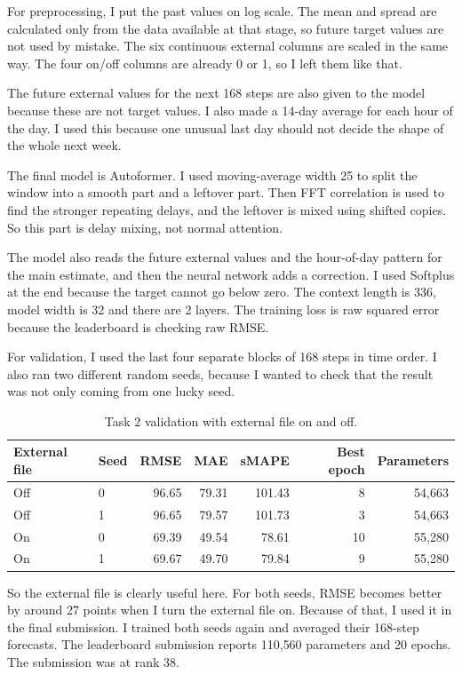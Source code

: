 \documentclass[11pt]{article}
\begin{document}
For preprocessing, I put the past values on log scale. The mean and spread are calculated only from the data available at that stage, so future target values are not used by mistake. The six continuous external columns are scaled in the same way. The four on/off columns are already 0 or 1, so I left them like that.

The future external values for the next 168 steps are also given to the model because these are not target values. I also made a 14-day average for each hour of the day. I used this because one unusual last day should not decide the shape of the whole next week.

The final model is Autoformer. I used moving-average width 25 to split the window into a smooth part and a leftover part. Then FFT correlation is used to find the stronger repeating delays, and the leftover is mixed using shifted copies. So this part is delay mixing, not normal attention.

The model also reads the future external values and the hour-of-day pattern for the main estimate, and then the neural network adds a correction. I used Softplus at the end because the target cannot go below zero. The context length is 336, model width is 32 and there are 2 layers. The training loss is raw squared error because the leaderboard is checking raw RMSE.

For validation, I used the last four separate blocks of 168 steps in time order. I also ran two different random seeds, because I wanted to check that the result was not only coming from one lucky seed.

\begin{table}[H]
\centering
\small
\begin{tabular}{llrrrrr}
\toprule
External file & Seed & RMSE & MAE & sMAPE & Best epoch & Parameters \\
\midrule
Off & 0 & 96.65 & 79.31 & 101.43 & 8 & 54{,}663 \\
Off & 1 & 96.65 & 79.57 & 101.73 & 3 & 54{,}663 \\
On & 0 & 69.39 & 49.54 & 78.61 & 10 & 55{,}280 \\
On & 1 & 69.67 & 49.70 & 79.84 & 9 & 55{,}280 \\
\bottomrule
\end{tabular}
\caption{Task 2 validation with external file on and off.}
\end{table}

So the external file is clearly useful here. For both seeds, RMSE becomes better by around 27 points when I turn the external file on. Because of that, I used it in the final submission. I trained both seeds again and averaged their 168-step forecasts. The leaderboard submission reports 110{,}560 parameters and 20 epochs. The submission was at rank 38.
\end{document}

